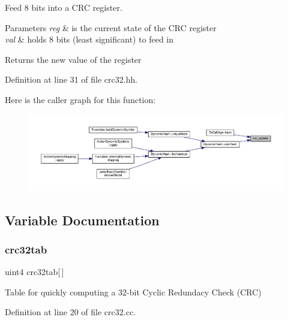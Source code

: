 Feed 8 bits into a C\+RC register. 


\begin{DoxyParams}{Parameters}
{\em reg} & is the current state of the C\+RC register \\
\hline
{\em val} & holds 8 bits (least significant) to feed in \\
\hline
\end{DoxyParams}
\begin{DoxyReturn}{Returns}
the new value of the register 
\end{DoxyReturn}


Definition at line 31 of file crc32.\+hh.

Here is the caller graph for this function\+:
\nopagebreak
\begin{figure}[H]
\begin{center}
\leavevmode
\includegraphics[width=350pt]{crc32_8hh_a2f8ef4e0e22c330442924367a838a87c_icgraph}
\end{center}
\end{figure}


\subsection{Variable Documentation}
\mbox{\label{crc32_8hh_a4b40516b18f2e8bbf32c619a0d9958d0}} 
\subsubsection{\texorpdfstring{crc32tab}{crc32tab}}
{\footnotesize\ttfamily uint4 crc32tab\mbox{[}$\,$\mbox{]}}



Table for quickly computing a 32-\/bit Cyclic Redundacy Check (C\+RC) 



Definition at line 20 of file crc32.\+cc.

